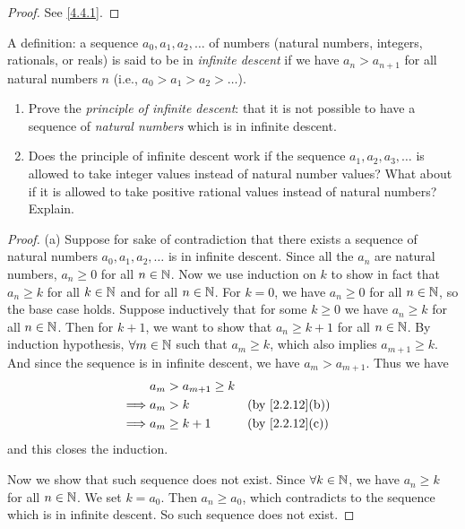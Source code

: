 \begin{proof}
  See \cref{4.4.1}.
\end{proof}

\begin{ex}\label{ex:4.4.2}
  A definition: a sequence \(a_0, a_1, a_2, \dots\) of numbers (natural numbers, integers, rationals, or reals) is said to be in \emph{infinite descent} if we have \(a_n > a_{n + 1}\) for all natural numbers \(n\)
  (i.e., \(a_0 > a_1 > a_2 > \dots\)).
  \begin{enumerate}
    \item Prove the \emph{principle of infinite descent}:
          that it is not possible to have a sequence of \emph{natural numbers} which is in infinite descent.
    \item Does the principle of infinite descent work if the sequence \(a_1, a_2, a_3, \dots\) is allowed to take integer values instead of natural number values?
          What about if it is allowed to take positive rational values instead of natural numbers?
          Explain.
  \end{enumerate}
\end{ex}

\begin{proof}{(a)}
  Suppose for sake of contradiction that there exists a sequence of natural numbers \(a_0, a_1, a_2, \dots\) is in infinite descent.
  Since all the \(a_n\) are natural numbers, \(a_n \geq 0\) for all \(n \in \mathbb{N}\).
  Now we use induction on \(k\) to show in fact that \(a_n \geq k\) for all \(k \in \mathbb{N}\) and for all \(n \in \mathbb{N}\).
  For \(k = 0\), we have \(a_n \geq 0\) for all \(n \in \mathbb{N}\), so the base case holds.
  Suppose inductively that for some \(k \geq 0\) we have \(a_n \geq k\) for all \(n \in \mathbb{N}\).
  Then for \(k + 1\), we want to show that \(a_n \geq k + 1\) for all \(n \in \mathbb{N}\).
  By induction hypothesis, \(\forall m \in \mathbb{N}\) such that \(a_m \geq k\), which also implies \(a_{m + 1} \geq k\).
  And since the sequence is in infinite descent, we have \(a_m > a_{m + 1}\).
  Thus we have
  \begin{align*}
             & a_m > a_{m + 1} \geq k                                   \\
    \implies & a_m > k                &  & \text{(by \cref{2.2.12}(b))} \\
    \implies & a_m \geq k + 1         &  & \text{(by \cref{2.2.12}(c))}
  \end{align*}
  and this closes the induction.

  Now we show that such sequence does not exist.
  Since \(\forall k \in \mathbb{N}\), we have \(a_n \geq k\) for all \(n \in \mathbb{N}\).
  We set \(k = a_0\).
  Then \(a_n \geq a_0\), which contradicts to the sequence which is in infinite descent.
  So such sequence does not exist.
\end{proof}

